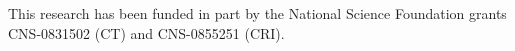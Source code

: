 \small
This research has been funded in part by the National Science
Foundation grants CNS-0831502 (CT) and CNS-0855251 (CRI).

